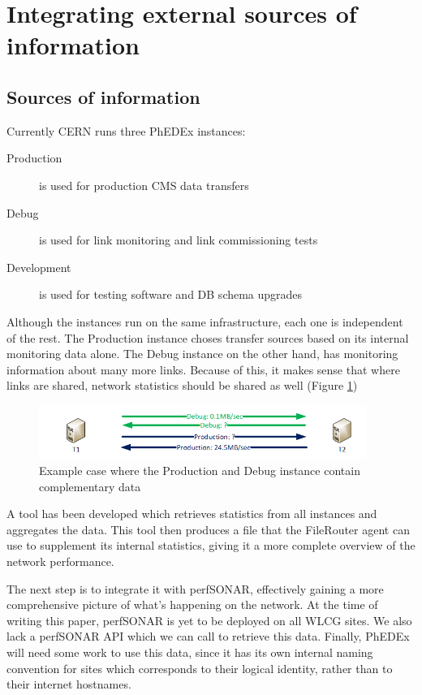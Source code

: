 \section{Integrating external sources of information}

\subsection{Sources of information}

Currently CERN runs three PhEDEx instances:

\begin{description}
	\item[Production] is used for production CMS data transfers
	\item[Debug] is used for link monitoring and link commissioning tests
	\item[Development] is used for testing software and DB schema upgrades
\end{description}

Although the instances run on the same infrastructure, each one is independent 
of the rest. The Production instance choses transfer sources based on its 
internal monitoring data alone. The Debug instance on the other hand,
has monitoring information about many more links. Because of this, it makes
sense that where links are shared, network statistics should be shared
as well (Figure \ref{fig:Prod-vs-Debug})

\begin{figure}[h]
  \centering
  \includegraphics[width=0.95\textwidth]{Figures/Debug-vs-Prod-instance.png}
  \caption{Example case where the Production and Debug instance contain complementary
  data}
  \label{fig:Prod-vs-Debug}
\end{figure} 

A tool has been developed which retrieves statistics from all instances and 
aggregates the data. This tool then produces a file that the FileRouter agent
can use to supplement its internal statistics, giving it a more complete overview of the
network performance.

The next step is to integrate it with perfSONAR\cite{perfSONAR}, effectively gaining a 
more comprehensive picture of what's happening on the network. At the time of
writing this paper, perfSONAR is yet to be deployed on all WLCG sites. We also
lack a perfSONAR API which we can call to retrieve this data. Finally, PhEDEx will need
some work to use this data, since it has its own internal naming convention for sites which corresponds to their logical identity, rather than to their internet hostnames.
